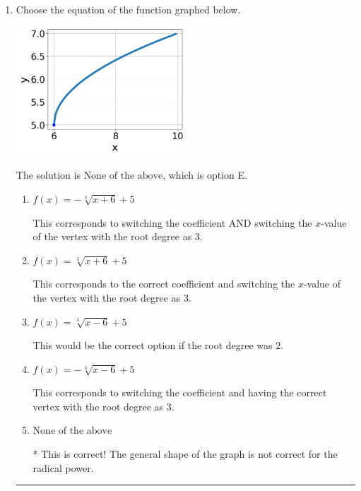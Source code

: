 \documentclass{extbook}[14pt]
\newcommand{\litem}[1]{\item #1

\rule{\textwidth}{0.4pt}}
\begin{document}
\begin{enumerate}\litem{
Choose the equation of the function graphed below.

\begin{center}
    \includegraphics[width=0.5\textwidth]{../Figures/radicalGraphToEquationA.png}
\end{center}


The solution is \( \text{None of the above} \), which is option E.\begin{enumerate}[label=\Alph*.]
\item \( f(x) = - \sqrt[3]{x + 6} + 5 \)

This corresponds to switching the coefficient AND switching the $x$-value of the vertex with the root degree as $3$.
\item \( f(x) = \sqrt[3]{x + 6} + 5 \)

This corresponds to the correct coefficient and switching the $x$-value of the vertex with the root degree as $3$.
\item \( f(x) = \sqrt[3]{x - 6} + 5 \)

This would be the correct option if the root degree was $2$.
\item \( f(x) = - \sqrt[3]{x - 6} + 5 \)

This corresponds to switching the coefficient and having the correct vertex with the root degree as $3$.
\item \( \text{None of the above} \)

* This is correct! The general shape of the graph is not correct for the radical power.
\end{enumerate}

}
\end{enumerate}
\end{document}
